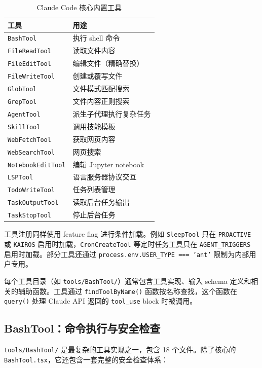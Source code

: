 \begin{table}[htbp]
\centering
\begin{tabularx}{\textwidth}{lX}
\toprule
\textbf{工具} & \textbf{用途} \\
\midrule
\texttt{BashTool} & 执行 shell 命令 \\
\texttt{FileReadTool} & 读取文件内容 \\
\texttt{FileEditTool} & 编辑文件（精确替换） \\
\texttt{FileWriteTool} & 创建或覆写文件 \\
\texttt{GlobTool} & 文件模式匹配搜索 \\
\texttt{GrepTool} & 文件内容正则搜索 \\
\texttt{AgentTool} & 派生子代理执行复杂任务 \\
\texttt{SkillTool} & 调用技能模板 \\
\texttt{WebFetchTool} & 获取网页内容 \\
\texttt{WebSearchTool} & 网页搜索 \\
\texttt{NotebookEditTool} & 编辑 Jupyter notebook \\
\texttt{LSPTool} & 语言服务器协议交互 \\
\texttt{TodoWriteTool} & 任务列表管理 \\
\texttt{TaskOutputTool} & 读取后台任务输出 \\
\texttt{TaskStopTool} & 停止后台任务 \\
\bottomrule
\end{tabularx}
\caption{Claude Code 核心内置工具}
\end{table}

工具注册同样使用 feature flag 进行条件加载。例如 \texttt{SleepTool} 只在 \texttt{PROACTIVE} 或 \texttt{KAIROS} 启用时加载，\texttt{CronCreateTool} 等定时任务工具只在 \texttt{AGENT\_TRIGGERS} 启用时加载。部分工具还通过 \texttt{process.env.USER\_TYPE === 'ant'} 限制为内部用户专用。

每个工具目录（如 \texttt{tools/BashTool/}）通常包含工具实现、输入 schema 定义和相关的辅助函数。工具通过 \texttt{findToolByName()} 函数按名称查找，这个函数在 \texttt{query()} 处理 Claude API 返回的 \texttt{tool\_use} block 时被调用。

\subsection{BashTool：命令执行与安全检查}

\texttt{tools/BashTool/} 是最复杂的工具实现之一，包含 18 个文件。除了核心的 \texttt{BashTool.tsx}，它还包含一套完整的安全检查体系：

